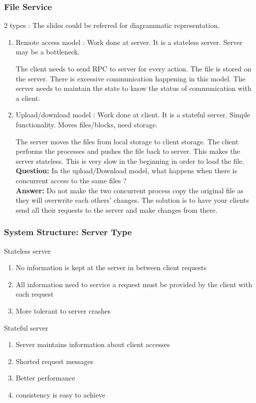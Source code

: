 \documentclass[twoside]{article}
\begin{document}
\subsubsection{File Service}
2 types : The slides could be referred for diagrammatic representation.
\begin{enumerate}
    \item Remote access model : Work done at server. It is a stateless server. Server may be a bottleneck. 
    \par
        The client needs to send RPC to server for every action. The file is stored on the server. There is excessive communication happening in this model. The server needs to maintain the state to know the status of communication with  a client. 
    \item Upload/download model : Work done at client. It is a stateful server. Simple functionality. Moves files/blocks, need storage.
    \par 
    The server moves the files from local storage to client storage. The client performs the processes and pushes the file back to server. This makes the server stateless. This is very slow in the beginning in order to load the file.\\
    \textbf{Question:} In the upload/Download model, what happens when there is concurrent access to the same files ?\\
    \textbf{Answer:} Do not make the two concurrent process copy the original file as they will overwrite each others' changes. The solution is to have your clients send all their requests to the server and make changes from there. 
\end{enumerate}
\subsubsection{System Structure: Server Type}
Stateless server
\begin{enumerate}
    \item No information is kept at the server in between client requests
    \item All information need to service a request must be provided by the client with each request
    \item More tolerant to server crashes
\end{enumerate}
Stateful server
\begin{enumerate}
    \item Server maintains information about client accesses
    \item Shorted request messages 
    \item Better performance 
    \item consistency is easy to achieve
\end{enumerate}
\end{document}
